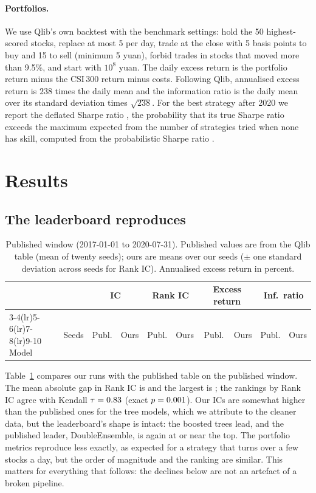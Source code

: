 \documentclass[11pt]{article}
\begin{document}
\paragraph{Portfolios.}
We use Qlib's own backtest with the benchmark settings: hold the 50 highest-scored stocks, replace at most 5 per day, trade at the close with 5 basis points to buy and 15 to sell (minimum 5 yuan), forbid trades in stocks that moved more than 9.5\%, and start with $10^8$ yuan.
The daily excess return is the portfolio return minus the CSI\,300 return minus costs.
Following Qlib, annualised excess return is $238$ times the daily mean and the information ratio is the daily mean over its standard deviation times $\sqrt{238}$.
For the best strategy after 2020 we report the deflated Sharpe ratio \citep{bailey2014deflated}, the probability that its true Sharpe ratio exceeds the maximum expected from the number of strategies tried when none has skill, computed from the probabilistic Sharpe ratio \citep{bailey2012sharpe}.

\section{Results}\label{sec:results}

\subsection{The leaderboard reproduces}

\begin{table}[t]
\centering\small
\caption{Published window (2017-01-01 to 2020-07-31). Published values are from the Qlib table (mean of twenty seeds); ours are means over our seeds ($\pm$ one standard deviation across seeds for Rank IC). Annualised excess return in percent.}\label{tab:repro}
\setlength{\tabcolsep}{4pt}
\begin{tabular}{lrrrrrrrrr}
\toprule
 & & \multicolumn{2}{c}{IC} & \multicolumn{2}{c}{Rank IC} & \multicolumn{2}{c}{Excess return} & \multicolumn{2}{c}{Inf.\ ratio} \\
\cmidrule(lr){3-4}\cmidrule(lr){5-6}\cmidrule(lr){7-8}\cmidrule(lr){9-10}
Model & Seeds & Publ. & Ours & Publ. & Ours & Publ. & Ours & Publ. & Ours \\
\midrule

\end{tabular}
\end{table}

Table~\ref{tab:repro} compares our runs with the published table on the published window.
The mean absolute gap in Rank IC is \ReproMeanGap{} and the largest is \ReproMaxGap{}; the rankings by Rank IC agree with Kendall $\tau=0.83$ (exact $p=0.001$).
Our ICs are somewhat higher than the published ones for the tree models, which we attribute to the cleaner data, but the leaderboard's shape is intact: the boosted trees lead, and the published leader, DoubleEnsemble, is again at or near the top.
The portfolio metrics reproduce less exactly, as expected for a strategy that turns over a few stocks a day, but the order of magnitude and the ranking are similar.
This matters for everything that follows: the declines below are not an artefact of a broken pipeline.
\end{document}
